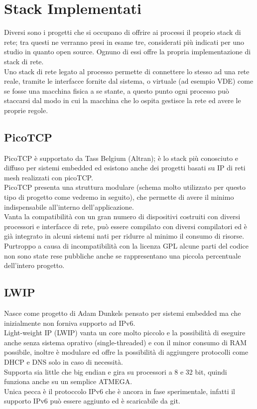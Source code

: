 \section{Stack Implementati}
Diversi sono i progetti che si occupano di offrire ai processi il proprio stack di rete; tra questi ne verranno presi in esame tre, considerati pi\`u indicati per uno studio in quanto open source. Ognuno di essi offre la propria implementazione di stack di rete.\\
Uno stack di rete legato al processo permette di connettere lo stesso ad una rete reale, tramite le interfacce fornite dal sistema, o virtuale (ad esempio VDE) come se fosse una macchina fisica a se stante, a questo punto ogni processo pu\`o staccarsi dal modo in cui la macchina che lo ospita gestisce la rete ed avere le proprie regole.\\

\subsection{PicoTCP}
PicoTCP\cite{K4} \`e supportato da Tass Belgium (Altran); \`e lo stack pi\`u conosciuto e diffuso per sistemi embedded ed esistono anche dei progetti basati su IP di reti mesh realizzati con picoTCP\cite{K14}.\\
PicoTCP presenta una struttura modulare (schema molto utilizzato per questo tipo di progetto come vedremo in seguito), che permette di avere il minimo indispensabile all'interno dell'applicazione.\\
Vanta la compatibilit\`a con un gran numero di dispositivi costruiti con diversi processori e interfacce di rete, pu\`o essere compilato con diversi compilatori ed \`e gi\`a integrato in alcuni sistemi nati per ridurre al minimo il consumo di risorse.\\
Purtroppo a causa di incompatibilit\`a con la licenza GPL alcune parti del codice non sono state rese pubbliche anche se rappresentano una piccola percentuale dell'intero progetto.
\subsection{LWIP}
Nasce come progetto di Adam Dunkels pensato per sistemi embedded ma che inizialmente non forniva supporto ad IPv6.\\
Light-weight IP (LWIP\cite{K13}) vanta un core molto piccolo e la possibilit\`a di eseguire anche senza sistema oprativo (single-threaded) e con il minor consumo di RAM possibile, inoltre \`e modulare ed offre la possibilit\`a di aggiungere protocolli come DHCP e DNS solo in caso di necessit\`a.\\
Supporta sia little che big endian e gira su processori a 8 e 32 bit, quindi funziona anche su un semplice ATMEGA.\\
Unica pecca \`e il protoccolo IPv6 che \`e ancora in fase sperimentale, infatti il supporto IPv6 pu\`o essere aggiunto ed \`e scaricabile da git.
